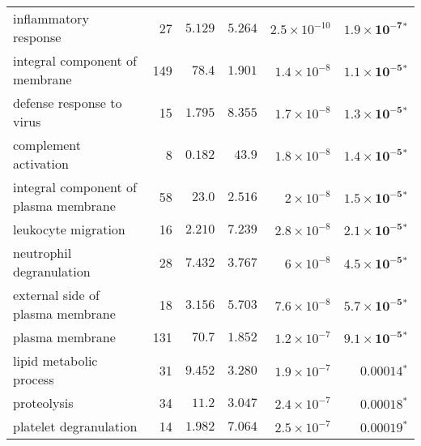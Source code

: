 \begin{longtable*}{|l|r|r|r|r|r|}
    inflammatory response                                 & 27                      & $ 5.129$                & $ 5.264$   & $2.5\times 10^{-10}$ & $\bm{1.9\times 10^{-7}{^*}}$    \\
    integral component of membrane                        & 149                     & $  78.4$                  & $ 1.901$   & $1.4\times 10^{-8}$  & $\bm{1.1\times 10^{-5}{^*}}$    \\
    defense response to virus                             & 15                      & $ 1.795$                & $ 8.355$   & $1.7\times 10^{-8}$  & $\bm{1.3\times 10^{-5}{^*}}$    \\
    complement activation                                 & 8                       & $ 0.182$                & $  43.9$     & $1.8\times 10^{-8}$  & $\bm{1.4\times 10^{-5}{^*}}$    \\
    integral component of plasma membrane                 & 58                      & $  23.0$                  & $ 2.516$   & $ 2\times 10^{-8}$   & $\bm{1.5\times 10^{-5}{^*}}$    \\
    leukocyte migration                                   & 16                      & $ 2.210$                & $ 7.239$   & $2.8\times 10^{-8}$  & $\bm{2.1\times 10^{-5}{^*}}$    \\
    neutrophil degranulation                              & 28                      & $ 7.432$                & $ 3.767$   & $ 6\times 10^{-8}$   & $\bm{4.5\times 10^{-5}{^*}}$    \\
    external side of plasma membrane                      & 18                      & $ 3.156$                & $ 5.703$   & $7.6\times 10^{-8}$  & $\bm{5.7\times 10^{-5}{^*}}$    \\
    plasma membrane                                       & 131                     & $  70.7$                  & $ 1.852$   & $1.2\times 10^{-7}$  & $\bm{9.1\times 10^{-5}{^*}}$    \\
    lipid metabolic process                               & 31                      & $ 9.452$                & $ 3.280$   & $1.9\times 10^{-7}$  & $\bm{0.00014{^*}}$              \\
    proteolysis                                           & 34                      & $  11.2$                  & $ 3.047$   & $2.4\times 10^{-7}$  & $\bm{0.00018{^*}}$              \\
    platelet degranulation                                & 14                      & $ 1.982$                & $ 7.064$   & $2.5\times 10^{-7}$  & $\bm{0.00019{^*}}$              \\

\end{longtable*}
